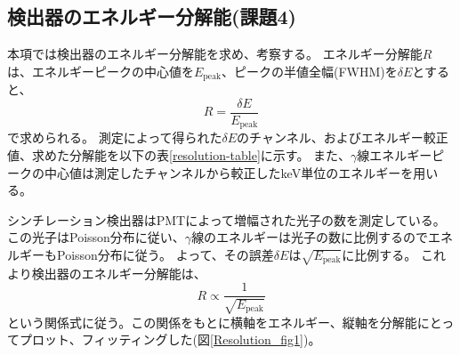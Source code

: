 \documentclass[11pt, titlepage, openany]{ltjsbook}
\begin{document}
\subsection{検出器のエネルギー分解能(課題4)}
本項では検出器のエネルギー分解能を求め、考察する。
エネルギー分解能$R$は、エネルギーピークの中心値を$E_{\mathrm{peak}}$、ピークの半値全幅(FWHM)を$\delta E$とすると、
\begin{equation}
    R = \frac{\delta E}{E_{\mathrm{peak}}}
\end{equation}
で求められる。
測定によって得られた$\delta E$のチャンネル、およびエネルギー較正値、求めた分解能を以下の表\ref{resolution-table}に示す。
また、$\gamma$線エネルギーピークの中心値は測定したチャンネルから較正したkeV単位のエネルギーを用いる。
\begin{table}[H]
    \centering
    \caption{エネルギーピークのFWHMとエネルギー分解能}
    \label{resolution-table}
\end{table}
シンチレーション検出器はPMTによって増幅された光子の数を測定している。
この光子はPoisson分布に従い、$\gamma$線のエネルギーは光子の数に比例するのでエネルギーもPoisson分布に従う。
よって、その誤差$\delta E$は$\sqrt{E_{\mathrm{peak}}}$に比例する。
これより検出器のエネルギー分解能は、
\begin{equation}
    R \propto \frac{1}{\sqrt{E_{\mathrm{peak}}}}
\end{equation}
という関係式に従う。この関係をもとに横軸をエネルギー、縦軸を分解能にとってプロット、フィッティングした(図\ref{Resolution_fig1})。
\end{document}
